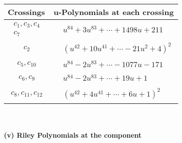 \documentclass[1p]{elsarticle_modified}
\theoremstyle{definition}
\begin{document}
\begin{tabular}{m{50pt}|m{274pt}}
Crossings & \hspace{64pt}u-Polynomials at each crossing \\
\hline $$\begin{aligned}c_{1},c_{3},c_{4}\\c_{7}\end{aligned}$$&$\begin{aligned}
&u^{84}+3 u^{83}+\cdots+1498 u+211
\end{aligned}$\\
\hline $$\begin{aligned}c_{2}\end{aligned}$$&$\begin{aligned}
&(u^{42}+10 u^{41}+\cdots-21 u^2+4)^{2}
\end{aligned}$\\
\hline $$\begin{aligned}c_{5},c_{10}\end{aligned}$$&$\begin{aligned}
&u^{84}-2 u^{83}+\cdots-1077 u-171
\end{aligned}$\\
\hline $$\begin{aligned}c_{6},c_{9}\end{aligned}$$&$\begin{aligned}
&u^{84}-2 u^{83}+\cdots+19 u+1
\end{aligned}$\\
\hline $$\begin{aligned}c_{8},c_{11},c_{12}\end{aligned}$$&$\begin{aligned}
&(u^{42}+4 u^{41}+\cdots+6 u+1)^{2}
\end{aligned}$\\
\hline
\end{tabular}\\~\\
\newpage\renewcommand{\arraystretch}{1}
\flushleft \textbf{(v) Riley Polynomials at the component}\newline \\
\end{document}
